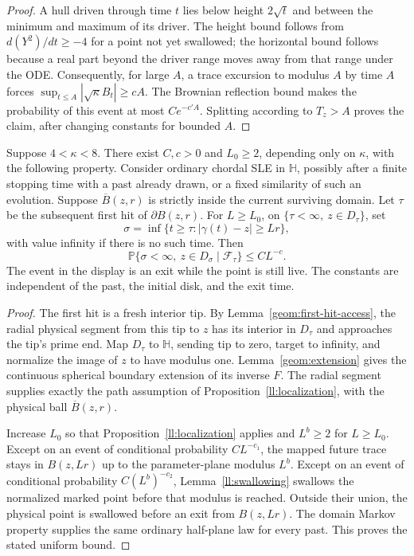 \begin{proof}
A hull driven through time $t$ lies below height $2\sqrt t$ and
between the minimum and maximum of its driver. The height bound
follows from $d(Y^2)/dt\ge-4$ for a point not yet swallowed;
the horizontal bound follows because a real part beyond the driver
range moves away from that range under the ODE. Consequently, for
large $A$, a trace excursion to modulus $A$ by time $A$ forces
$\sup_{t\le A}|\sqrt\kappa B_t|\ge cA$.
The Brownian reflection bound makes the probability of this event
at most $Ce^{-c'A}$. Splitting according to $T_z>A$ proves the
claim, after changing constants for bounded $A$.
\end{proof}

\begin{proposition}
\label{ll:disk-rule}
Suppose $4<\kappa<8$. There exist $C,c>0$ and $L_0\ge2$, depending only
on $\kappa$, with the following property. Consider ordinary chordal SLE
in $\mathbb H$,
possibly after a finite stopping time with a past already drawn,
or a fixed similarity of such an evolution. Suppose
$\overline B(z,r)$ is strictly inside the current surviving domain.
Let $\tau$ be the subsequent first hit of $\partial B(z,r)$.
For $L\ge L_0$, on $\{\tau<\infty,\ z\in D_\tau\}$, set
\[
 \sigma=\inf\{t\ge\tau:|\gamma(t)-z|\ge Lr\},
\]
with value infinity if there is no such time. Then
\[
 \mathbb P\{\sigma<\infty,\ z\in D_\sigma
                    \mid\mathcal F_\tau\}\le CL^{-c}.
\]
The event in the display is an exit while the point is still live.
The constants are independent of the past, the initial disk, and the exit
time.
\end{proposition}

\begin{proof}
The first hit is a fresh interior tip. By
Lemma~\ref{geom:first-hit-access}, the radial physical segment from
this tip to $z$ has its interior in $D_\tau$ and approaches the
tip's prime end. Map $D_\tau$ to $\mathbb H$, sending tip to zero,
target to infinity, and normalize the image of $z$ to have modulus
one. Lemma~\ref{geom:extension} gives the continuous spherical
boundary extension of its inverse $F$. The radial segment supplies
exactly the path assumption of Proposition~\ref{ll:localization},
with the physical ball $\overline B(z,r)$.

Increase $L_0$ so that Proposition~\ref{ll:localization} applies and
$L^b\ge2$ for $L\ge L_0$.  Except on an event of conditional probability
$CL^{-c_1}$, the
mapped future trace stays in $B(z,Lr)$ up to the parameter-plane
modulus $L^b$. Except on an event of conditional probability
$C(L^b)^{-c_2}$, Lemma~\ref{ll:swallowing} swallows the normalized
marked point before that modulus is reached. Outside their union,
the physical point is swallowed before an exit from $B(z,Lr)$.
The domain Markov property supplies the same ordinary half-plane
law for every past. This proves the stated uniform bound.
\end{proof}

